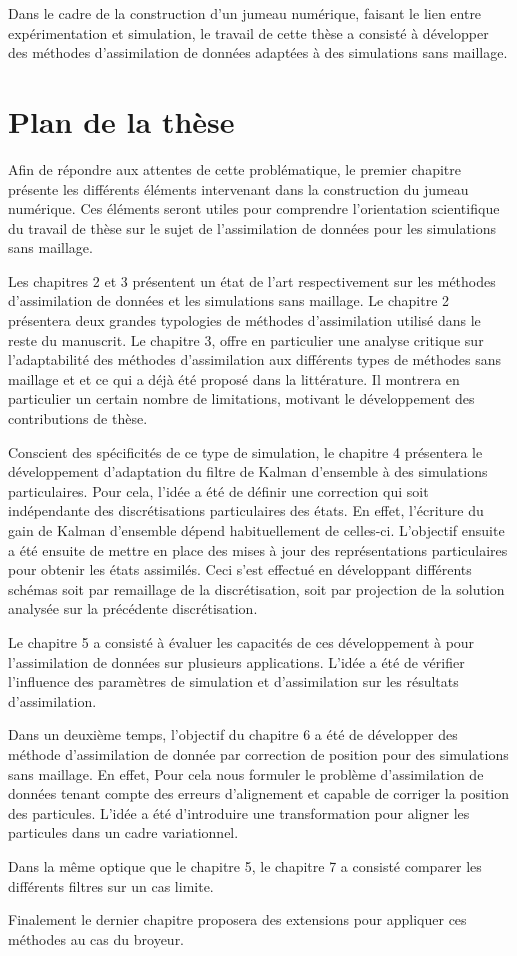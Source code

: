 Dans le cadre de la construction d'un jumeau numérique, faisant le lien entre expérimentation et simulation, le travail de cette thèse a consisté à développer des méthodes d'assimilation de données adaptées à des simulations sans maillage.

\section*{Plan de la thèse}

Afin de répondre aux attentes de cette problématique, le premier chapitre présente les différents éléments intervenant dans la construction du jumeau numérique. Ces éléments seront utiles pour comprendre l'orientation scientifique du travail de thèse sur le sujet de l'assimilation de données pour les simulations sans maillage.

Les chapitres 2 et 3 présentent un état de l'art respectivement sur les méthodes d'assimilation de données et les simulations sans maillage. Le chapitre 2 présentera deux grandes typologies de méthodes d'assimilation utilisé dans le reste du manuscrit. Le chapitre 3, offre en particulier une analyse critique sur l'adaptabilité des méthodes d'assimilation aux différents types de méthodes sans maillage et et ce qui a déjà été proposé dans la littérature. Il montrera en particulier un certain nombre de limitations, motivant le développement des contributions de thèse.

Conscient des spécificités de ce type de simulation, le chapitre 4 présentera le développement d'adaptation du filtre de Kalman d'ensemble à des simulations particulaires. Pour cela, l'idée a été de définir une correction qui soit indépendante des discrétisations particulaires des états. En effet, l'écriture du gain de Kalman d'ensemble dépend habituellement de celles-ci. L’objectif ensuite a été ensuite de mettre en place des mises à jour des représentations particulaires pour obtenir les états assimilés. Ceci s’est effectué en développant différents schémas soit par remaillage de la discrétisation, soit par projection de la solution analysée sur la précédente discrétisation.

Le chapitre 5 a consisté à évaluer les capacités de ces développement à pour l'assimilation de données sur plusieurs applications. L'idée a été de vérifier l'influence des paramètres de simulation et d'assimilation sur les résultats d'assimilation.

Dans un deuxième temps, l'objectif du chapitre 6 a été de développer des méthode d'assimilation de donnée par correction de position pour des simulations sans maillage. En effet, Pour cela nous formuler le problème d'assimilation de données tenant compte des erreurs d'alignement et capable de corriger la position des particules. L'idée a été d'introduire une transformation pour aligner les particules dans un cadre variationnel.

Dans la même optique que le chapitre 5, le chapitre 7 a consisté comparer les différents filtres sur un cas limite.

Finalement le dernier chapitre proposera des extensions pour appliquer ces méthodes au cas du broyeur.